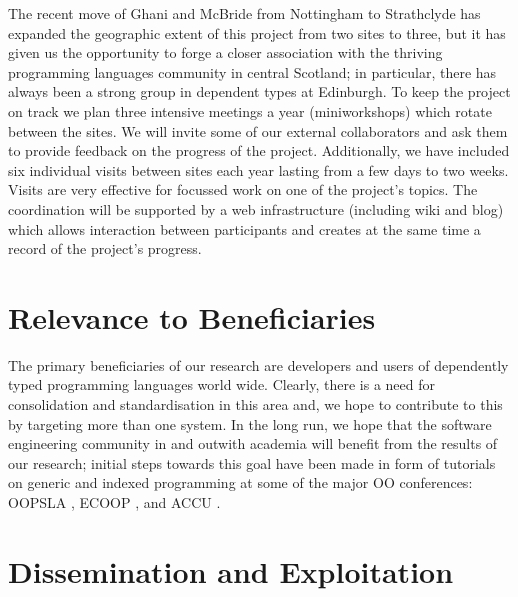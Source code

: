 \documentclass[a4paper]{article}
\begin{document}
The recent move of Ghani and McBride from Nottingham to Strathclyde
has expanded the geographic extent of this project from two sites to
three, but it has given us the opportunity to forge a closer
association with the thriving programming languages community in
central Scotland; in particular, there has always been a strong group
in dependent types at Edinburgh. To keep the project on track we plan
three intensive meetings a year (miniworkshops) which rotate between
the sites. We will invite some of our external collaborators and ask
them to provide feedback on the progress of the project. Additionally,
we have included six individual visits between sites each year lasting
from a few days to two weeks. Visits are very effective for focussed
work on one of the project's topics. The coordination will be
supported by a web infrastructure (including wiki and blog) which
allows interaction between participants and creates at the same time a
record of the project's progress.

\section{Relevance to Beneficiaries}

The primary beneficiaries of our research are developers and users of
dependently typed programming languages world wide. Clearly, there is
a need for consolidation and standardisation in this area and, we hope
to contribute to this by targeting more than one system. In the long
run, we hope that the software engineering community in and outwith
academia will benefit from the results of our research; initial
steps towards this goal have been made in form of tutorials on generic
and indexed programming at some of the major
OO conferences: 
OOPSLA \cite{Gibbons2005:DesignOOPSLA},
ECOOP \cite{Gibbons2005:DesignECOOP}, 
and ACCU \cite{Gibbons2008:indexedACCU}.


\section{Dissemination and Exploitation}
\end{document}
